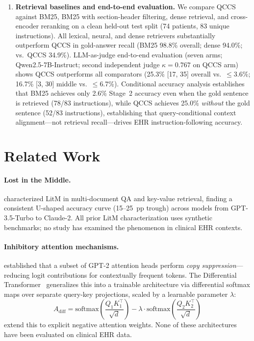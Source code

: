 \documentclass{article}
\begin{document}
\begin{enumerate}[leftmargin=*, topsep=2pt, itemsep=1pt]
  \item \textbf{Retrieval baselines and end-to-end evaluation.} We compare QCCS
  against BM25, BM25 with section-header filtering, dense retrieval, and cross-encoder
  reranking on a clean held-out test split (74 patients, 83 unique instructions).
  All lexical, neural, and dense retrievers substantially outperform QCCS in
  gold-answer recall (BM25 98.8\% overall; dense 94.0\%; vs.\ QCCS 34.9\%).
  LLM-as-judge end-to-end evaluation (seven arms; Qwen2.5-7B-Instruct; second
  independent judge $\kappa = 0.767$ on QCCS arm) shows QCCS outperforms all
  comparators (25.3\% [17, 35] overall vs.\ $\leq$3.6\%; 16.7\% [3, 30]
  middle vs.\ $\leq$6.7\%). Conditional accuracy analysis establishes that
  BM25 achieves only 2.6\% Stage~2 accuracy even when the gold sentence is
  retrieved (78/83 instructions), while QCCS achieves 25.0\% \emph{without}
  the gold sentence (52/83 instructions), establishing that
  query-conditional context alignment---not retrieval recall---drives
  EHR instruction-following accuracy.
\end{enumerate}

\section{Related Work}
\label{sec:background}

\paragraph{Lost in the Middle.}
\citet{liu2024lost} characterized LitM in multi-document QA and key-value retrieval,
finding a consistent U-shaped accuracy curve (15--25~pp trough) across models from
GPT-3.5-Turbo to Claude-2. All prior LitM characterization uses synthetic benchmarks;
no study has examined the phenomenon in clinical EHR contexts.

\paragraph{Inhibitory attention mechanisms.}
\citet{mcdougall2023copy} established that a subset of GPT-2 attention heads perform
\emph{copy suppression}---reducing logit contributions for contextually frequent tokens.
The Differential Transformer~\cite{ye2025differential} generalizes this into a trainable
architecture via differential softmax maps over separate query-key projections,
scaled by a learnable parameter $\lambda$:
\begin{equation}
  A_\mathrm{diff} = \mathrm{softmax}\!\left(\frac{Q_1 K_1^\top}{\sqrt{d}}\right)
    - \lambda \cdot \mathrm{softmax}\!\left(\frac{Q_2 K_2^\top}{\sqrt{d}}\right)
  \label{eq:diffattn}
\end{equation}
\citet{lv2024negative} extend this to explicit negative attention weights.
None of these architectures have been evaluated on clinical EHR data.
\end{document}
